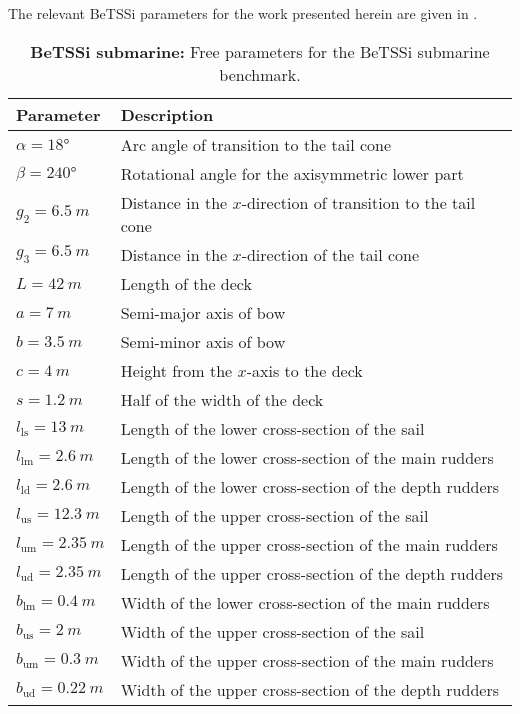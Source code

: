 The relevant BeTSSi parameters for the work presented herein are given in .
\begin{table}
	\centering
	\caption{\textbf{BeTSSi submarine:} Free parameters for the BeTSSi submarine benchmark.}
	\label{Tab3:BeTSSiParameters}
	\begin{tabular}{l l}
		\toprule
		Parameter & Description\\
		\midrule
		$\alpha=\ang{18}$ & Arc angle of transition to the tail cone\\
		$\beta=\ang{240}$ & Rotational angle for the axisymmetric lower part\\
		$g_2=\SI{6.5}{m}$ & Distance in the $x$-direction of transition to the tail cone\\
		$g_3=\SI{6.5}{m}$ & Distance in the $x$-direction of the tail cone\\
		$L=\SI{42}{m}$ & Length of the deck\\
		$a=\SI{7}{m}$ & Semi-major axis of bow\\
		$b=\SI{3.5}{m}$ & Semi-minor axis of bow\\
		$c=\SI{4}{m}$ & Height from the $x$-axis to the deck\\
		$s=\SI{1.2}{m}$ & Half of the width of the deck\\
		$l_{\mathrm{ls}}=\SI{13}{m}$ & Length of the lower cross-section of the sail\\
		$l_{\mathrm{lm}}=\SI{2.6}{m}$ & Length of the lower cross-section of the main rudders\\
		$l_{\mathrm{ld}}=\SI{2.6}{m}$ & Length of the lower cross-section of the depth rudders\\
		$l_{\mathrm{us}}=\SI{12.3}{m}$ & Length of the upper cross-section of the sail\\
		$l_{\mathrm{um}}=\SI{2.35}{m}$ & Length of the upper cross-section of the main rudders\\
		$l_{\mathrm{ud}}=\SI{2.35}{m}$ & Length of the upper cross-section of the depth rudders\\
		$b_{\mathrm{lm}}=\SI{0.4}{m}$ & Width of the lower cross-section of the main rudders\\
		$b_{\mathrm{us}}=\SI{2}{m}$ & Width of the upper cross-section of the sail\\
		$b_{\mathrm{um}}=\SI{0.3}{m}$ & Width of the upper cross-section of the main rudders\\
		$b_{\mathrm{ud}}=\SI{0.22}{m}$ & Width of the upper cross-section of the depth rudders\\

\end{tabular}
\end{table}
